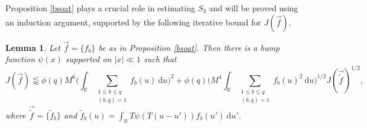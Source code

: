 \documentclass[12pt]{amsart}
\newtheorem{lemma}[theorem]{Lemma}
\theoremstyle{definition}
\theoremstyle{plain}
\theoremstyle{remark}
\numberwithin{equation}{section}
\numberwithin{theorem}{section}
\numberwithin{equation}{section}
\begin{document}
	
	Proposition \ref{bsoat} plays a crucial role in estimating $S_3$ and will be proved using an induction argument, supported by the following iterative bound for $J(\overrightarrow{f})$.
	\begin{lemma}\label{IterabJf}
		Let $\overrightarrow{f}=\{f_{b}\}$ be as in Proposition \ref{bsoat}. Then there is a bump function $\psi(x)$ supported on $|x| \ll 1$ such that
		\[J(\overrightarrow{f})\lessapprox \phi(q) M^{6}\bigg(\int_{\mathbb{R}}\sum_{\substack{1 \leq b \leq q \\ (b, q)=1}}f_{b}(u)\:\mathrm{d}u\bigg)^{2}+
		\phi(q)\bigg(M^{4}\int_{\mathbb{R}}\sum_{\substack{1 \leq b \leq q \\ (b, q)=1}}f_{b}(u)^{2}\:\mathrm{d}u\bigg)^{1/2}J(\overrightarrow{\tilde{f}})^{1/2},\]
		where $\overrightarrow{\tilde{f}}=\{\tilde{f}_{b}\}$ and $\tilde{f}_{b}(u)=\int_{\mathbb{R}}T\psi(T(u-u'))f_{b}(u')\:\mathrm{d}u'$.
	\end{lemma}
	\vspace{1pt}
\end{document}
